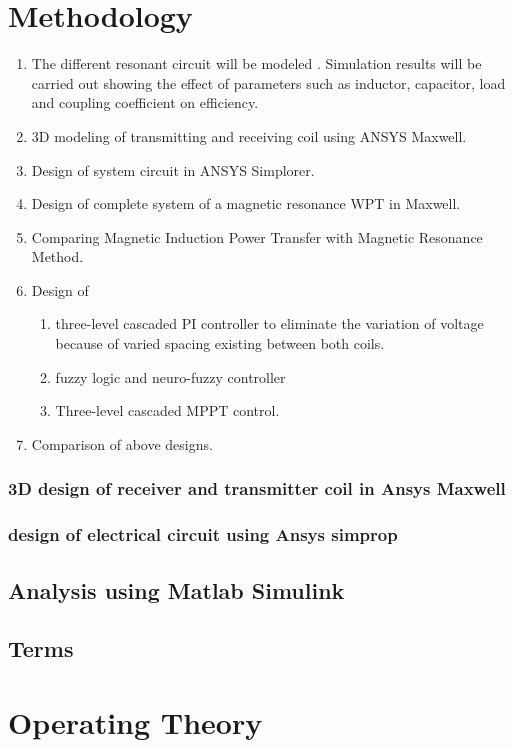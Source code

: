 \documentclass[12pt]{article}
\begin{document}
\section{Methodology}
\begin{enumerate}
	\item The different resonant circuit will be modeled . Simulation results will be carried out showing the effect of parameters such as inductor, capacitor, load and coupling coefficient on efficiency. 
	\item 3D modeling of transmitting and receiving coil using ANSYS Maxwell. 
	\item Design of system circuit in ANSYS Simplorer. 
	\item Design of complete system of a magnetic resonance WPT in Maxwell. 
	\item Comparing Magnetic Induction Power Transfer with Magnetic Resonance Method. 
	\item Design of 
		\begin{enumerate}
			\item three-level cascaded PI controller  to eliminate the variation of voltage because of varied spacing existing between both coils.
			\item fuzzy logic and neuro-fuzzy controller
			\item Three-level cascaded MPPT control. 
		\end{enumerate}
	\item Comparison of above designs. 
\end{enumerate}

\subsubsection{3D design of receiver and transmitter coil in Ansys Maxwell}
\subsubsection{design of electrical circuit using Ansys simprop}
\subsection{Analysis using Matlab Simulink}

\subsection{Terms}
\section{Operating Theory}
\end{document}
